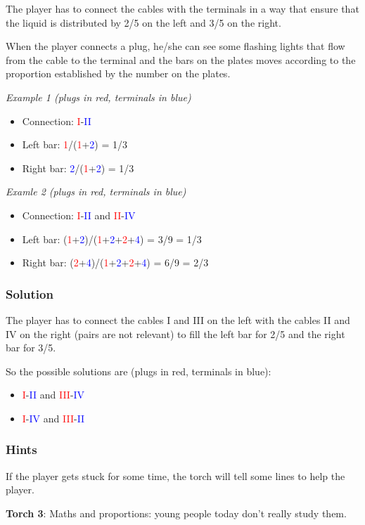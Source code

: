 The player has to connect the cables with the terminals in a way that ensure that the liquid is distributed by 2/5 on the left and 3/5 on the right.

When the player connects a plug, he/she can see some flashing lights that flow from the cable to the terminal and the bars on the plates moves according to the proportion established by the number on the plates.

\textit{Example 1 (plugs in red, terminals in blue)}
\begin{itemize}
	\item Connection: \textcolor{red}{I}-\textcolor{blue}{II}
	\item Left bar: \textcolor{red}{1}/(\textcolor{red}{1}+\textcolor{blue}{2}) = 1/3
	\item Right bar: \textcolor{blue}{2}/(\textcolor{red}{1}+\textcolor{blue}{2}) = 1/3
\end{itemize}

\textit{Examle 2 (plugs in red, terminals in blue)}
\begin{itemize}
	\item Connection: \textcolor{red}{I}-\textcolor{blue}{II} and \textcolor{red}{II}-\textcolor{blue}{IV}
	\item Left bar: (\textcolor{red}{1}+\textcolor{blue}{2})/(\textcolor{red}{1}+\textcolor{blue}{2}+\textcolor{red}{2}+\textcolor{blue}{4}) = 3/9 = 1/3
	\item Right bar: (\textcolor{red}{2}+\textcolor{blue}{4})/(\textcolor{red}{1}+\textcolor{blue}{2}+\textcolor{red}{2}+\textcolor{blue}{4}) = 6/9 = 2/3
\end{itemize}

\subsubsection*{Solution}
The player has to connect the cables I and III on the left with the cables II and IV on the right (pairs are not relevant) to fill the left bar for 2/5 and the right bar for 3/5.

So the possible solutions are (plugs in red, terminals in blue):
\begin{itemize}
	\item \textcolor{red}{I}-\textcolor{blue}{II} and \textcolor{red}{III}-\textcolor{blue}{IV}
	\item \textcolor{red}{I}-\textcolor{blue}{IV} and \textcolor{red}{III}-\textcolor{blue}{II}
\end{itemize}

\subsubsection*{Hints}
If the player gets stuck for some time, the torch will tell some lines to help the player.

\textbf{Torch 3}: Maths and proportions: young people today don't really study them.
